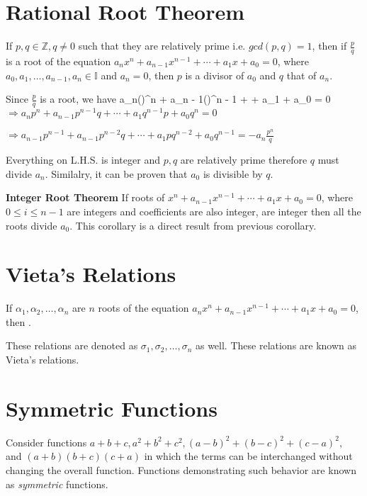 \section{Rational Root Theorem}
\starttheorem
If $p, q\in\mathbb{Z}, q\neq 0$ such that they are relatively prime i.e. $gcd(p, q) = 1$, then if
$\frac{p}{q}$ is a root of the equation $a_nx^n + a_{n - 1}x^{n - 1} + \cdots + a_1x + a_0 = 0$, where $a_0,
a_1, \ldots, a_{n - 1}, a_n \in\mathbb{I}$ and $a_n = 0$, then $p$ is a divisor of $a_0$ and $q$ that of
$a_n$.
\stoptheorem

\startproof
  Since $\frac{p}{q}$ is a root, we have
  \startformula a_n\left(\right)^n + a_{n - 1}\left(\right)^{n - 1} + \cdots +
    a_1 + a_0 = 0\stopformula
  $\Rightarrow a_np^n + a_{n - 1}p^{n - 1}q + \cdots + a_1q^{n - 1}p + a_0q^n = 0$

  $\Rightarrow a_{n - 1}p^{n - 1} + a_{n - 1}p^{n - 2}q + \cdots + a_1pq^{n - 2} + a_0q^{n - 1} =
    -a_n\frac{p^n}{q}$

  Everything on L.H.S. is integer and $p, q$ are relatively prime therefore $q$ must divide $a_n$.
  Similalry, it can be proven that $a_0$ is divisible by $q$.
\stopproof

\startcorollary
  {\bf Integer Root Theorem} If roots of $x^n + a_{n - 1}x^{n - 1} + \cdots + a_1x + a_0 = 0$, where $0\leq i\leq n- 1$ are integers
  and coefficients are also integer, are integer then all the roots divide $a_0$.
\stopcorollary
\startproof
  This corollary is a direct result from previous corollary.
\stopproof

\section{Vieta's Relations}
If $\alpha_1, \alpha_2, \ldots, \alpha_n$ are $n$ roots of the equation $a_nx^n + a_{n - 1}x^{n - 1} +
\cdots + a_1x + a_0 = 0$, then .

These relations are denoted as $\sigma_1, \sigma_2, \ldots, \sigma_n$ as well.
These relations are known as Vieta's relations.

\section{Symmetric Functions}
Consider functions $a + b + c, a^2 + b^2 + c^2, (a - b)^2 + (b - c)^2 + (c - a)^2,$ and $(a + b)(b + c)(c +
a)$ in which the terms can be interchanged without changing the overall function. Functions demonstrating
such behavior are known as {\it symmetric} functions.


